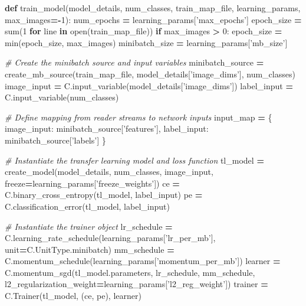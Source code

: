 \documentclass[]{book}
\newenvironment{Shaded}{\begin{snugshade}}{\end{snugshade}}
\newcommand{\KeywordTok}[1]{\textcolor[rgb]{0.13,0.29,0.53}{\textbf{#1}}}
\newcommand{\DecValTok}[1]{\textcolor[rgb]{0.00,0.00,0.81}{#1}}
\newcommand{\StringTok}[1]{\textcolor[rgb]{0.31,0.60,0.02}{#1}}
\newcommand{\CommentTok}[1]{\textcolor[rgb]{0.56,0.35,0.01}{\textit{#1}}}
\newcommand{\ControlFlowTok}[1]{\textcolor[rgb]{0.13,0.29,0.53}{\textbf{#1}}}
\newcommand{\OperatorTok}[1]{\textcolor[rgb]{0.81,0.36,0.00}{\textbf{#1}}}
\newcommand{\BuiltInTok}[1]{#1}
\newcommand{\NormalTok}[1]{#1}
\theoremstyle{definition}
\theoremstyle{definition}
\theoremstyle{definition}
\theoremstyle{remark}
\begin{document}
\begin{Shaded}
\begin{Highlighting}[]
\KeywordTok{def}\NormalTok{ train_model(model_details, num_classes, train_map_file,}
\NormalTok{                learning_params, max_images}\OperatorTok{=-}\DecValTok{1}\NormalTok{):}
\NormalTok{    num_epochs }\OperatorTok{=}\NormalTok{ learning_params[}\StringTok{'max_epochs'}\NormalTok{]}
\NormalTok{    epoch_size }\OperatorTok{=} \BuiltInTok{sum}\NormalTok{(}\DecValTok{1} \ControlFlowTok{for}\NormalTok{ line }\KeywordTok{in} \BuiltInTok{open}\NormalTok{(train_map_file))}
    \ControlFlowTok{if}\NormalTok{ max_images }\OperatorTok{>} \DecValTok{0}\NormalTok{:}
\NormalTok{        epoch_size }\OperatorTok{=} \BuiltInTok{min}\NormalTok{(epoch_size, max_images)}
\NormalTok{    minibatch_size }\OperatorTok{=}\NormalTok{ learning_params[}\StringTok{'mb_size'}\NormalTok{]}
    
    \CommentTok{# Create the minibatch source and input variables}
\NormalTok{    minibatch_source }\OperatorTok{=}\NormalTok{ create_mb_source(train_map_file, model_details[}\StringTok{'image_dims'}\NormalTok{], num_classes)}
\NormalTok{    image_input }\OperatorTok{=}\NormalTok{ C.input_variable(model_details[}\StringTok{'image_dims'}\NormalTok{])}
\NormalTok{    label_input }\OperatorTok{=}\NormalTok{ C.input_variable(num_classes)}

    \CommentTok{# Define mapping from reader streams to network inputs}
\NormalTok{    input_map }\OperatorTok{=}\NormalTok{ \{}
\NormalTok{        image_input: minibatch_source[}\StringTok{'features'}\NormalTok{],}
\NormalTok{        label_input: minibatch_source[}\StringTok{'labels'}\NormalTok{]}
\NormalTok{    \}}

    \CommentTok{# Instantiate the transfer learning model and loss function}
\NormalTok{    tl_model }\OperatorTok{=}\NormalTok{ create_model(model_details, num_classes, image_input, freeze}\OperatorTok{=}\NormalTok{learning_params[}\StringTok{'freeze_weights'}\NormalTok{])}
\NormalTok{    ce }\OperatorTok{=}\NormalTok{ C.binary_cross_entropy(tl_model, label_input)}
\NormalTok{    pe }\OperatorTok{=}\NormalTok{ C.classification_error(tl_model, label_input)}

    \CommentTok{# Instantiate the trainer object}
\NormalTok{    lr_schedule }\OperatorTok{=}\NormalTok{ C.learning_rate_schedule(learning_params[}\StringTok{'lr_per_mb'}\NormalTok{], unit}\OperatorTok{=}\NormalTok{C.UnitType.minibatch)}
\NormalTok{    mm_schedule }\OperatorTok{=}\NormalTok{ C.momentum_schedule(learning_params[}\StringTok{'momentum_per_mb'}\NormalTok{])}
\NormalTok{    learner }\OperatorTok{=}\NormalTok{ C.momentum_sgd(tl_model.parameters, lr_schedule, mm_schedule, }
\NormalTok{                           l2_regularization_weight}\OperatorTok{=}\NormalTok{learning_params[}\StringTok{'l2_reg_weight'}\NormalTok{])}
\NormalTok{    trainer }\OperatorTok{=}\NormalTok{ C.Trainer(tl_model, (ce, pe), learner)}


\end{Highlighting}
\end{Shaded}
\end{document}
